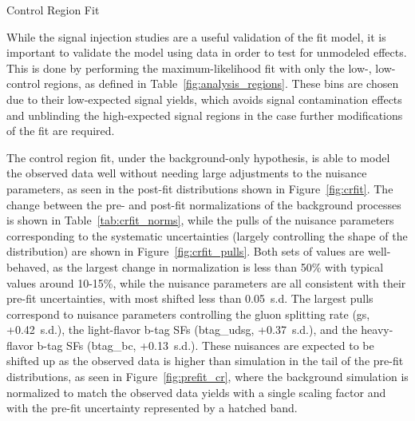 \begin{subsection}{Control Region Fit}
\label{subsec:crfit}

While the signal injection studies are a useful validation of the fit model, it is important to validate the model using data in order to test for unmodeled effects.
This is done by performing the maximum-likelihood fit with only the low-\Njets, low-\MJ control regions, as defined in Table~\ref{fig:analysis_regions}.
These bins are chosen due to their low-expected signal yields, which avoids signal contamination effects and unblinding the high-expected signal regions in the case further modifications of the fit are required.

The control region fit, under the background-only hypothesis, is able to model the observed data well without needing large adjustments to the nuisance parameters, as seen in the post-fit \Nb distributions shown in Figure~\ref{fig:crfit}.
The change between the pre- and post-fit normalizations of the background processes is shown in Table~\ref{tab:crfit_norms}, while the pulls of the nuisance parameters corresponding to the systematic uncertainties (largely controlling the shape of the \Nb distribution) are shown in Figure~\ref{fig:crfit_pulls}.
Both sets of values are well-behaved, as the largest change in normalization is less than 50\% with typical values around 10-15\%, while the nuisance parameters are all consistent with their pre-fit uncertainties, with most shifted less than 0.05~s.d.
The largest pulls correspond to nuisance parameters controlling the gluon splitting rate (gs, +0.42~s.d.), the light-flavor b-tag SFs (btag\_udsg, +0.37~s.d.), and the heavy-flavor b-tag SFs (btag\_bc, +0.13~s.d.).
These nuisances are expected to be shifted up as the observed data is higher than simulation in the tail of the pre-fit \Nb distributions, as seen in Figure~\ref{fig:prefit_cr}, where the background simulation is normalized to match the observed data yields with a single scaling factor and with the pre-fit uncertainty represented by a hatched band.


\end{subsection}
